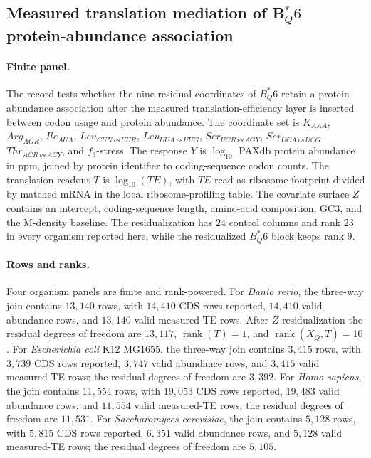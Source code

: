 \subsection{Measured translation mediation of B$^*_Q6$ protein-abundance association}\label{sec:bioreality-q6-measured-mqtp-protein-abundance}

\paragraph{Finite panel.}
The record tests whether the nine residual coordinates of $B^*_Q6$ retain a protein-abundance association after the measured translation-efficiency layer is inserted between codon usage and protein abundance. The coordinate set is
$K_{AAA}$, $Arg_{AGR}$, $Ile_{AUA}$, $Leu_{CUN\,vs\,UUR}$, $Leu_{UUA\,vs\,UUG}$, $Ser_{UCR\,vs\,AGY}$, $Ser_{UCA\,vs\,UCG}$, $Thr_{ACR\,vs\,ACY}$, and $f_3$-stress. The response $Y$ is $\log_{10}$ PAXdb protein abundance in ppm, joined by protein identifier to coding-sequence codon counts. The translation readout $T$ is $\log_{10}(TE)$, with $TE$ read as ribosome footprint divided by matched mRNA in the local ribosome-profiling table. The covariate surface $Z$ contains an intercept, coding-sequence length, amino-acid composition, GC3, and the M-density baseline. The residualization has $24$ control columns and rank $23$ in every organism reported here, while the residualized $B^*_Q6$ block keeps rank $9$.

\paragraph{Rows and ranks.}
Four organism panels are finite and rank-powered. For \emph{Danio rerio}, the three-way join contains $13{,}140$ rows, with $14{,}410$ CDS rows reported, $14{,}410$ valid abundance rows, and $13{,}140$ valid measured-TE rows. After $Z$ residualization the residual degrees of freedom are $13{,}117$, $\operatorname{rank}(T)=1$, and $\operatorname{rank}(X_Q,T)=10$. For \emph{Escherichia coli} K12 MG1655, the three-way join contains $3{,}415$ rows, with $3{,}739$ CDS rows reported, $3{,}747$ valid abundance rows, and $3{,}415$ valid measured-TE rows; the residual degrees of freedom are $3{,}392$. For \emph{Homo sapiens}, the join contains $11{,}554$ rows, with $19{,}053$ CDS rows reported, $19{,}483$ valid abundance rows, and $11{,}554$ valid measured-TE rows; the residual degrees of freedom are $11{,}531$. For \emph{Saccharomyces cerevisiae}, the join contains $5{,}128$ rows, with $5{,}815$ CDS rows reported, $6{,}351$ valid abundance rows, and $5{,}128$ valid measured-TE rows; the residual degrees of freedom are $5{,}105$.

